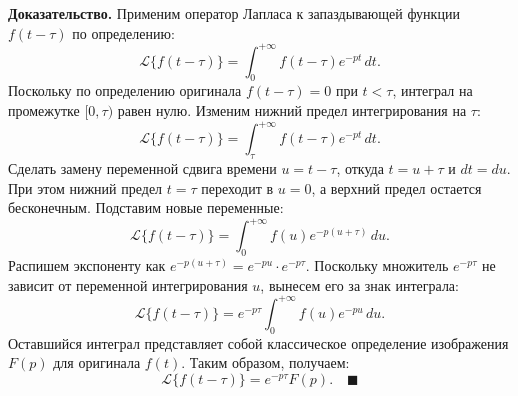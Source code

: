 \documentclass[12pt, a4paper]{article}
\theoremstyle{definition}
\theoremstyle{remark}
\begin{document}
\textbf{Доказательство.} Применим оператор Лапласа к запаздывающей функции $f(t - \tau)$ по определению:
$$\mathcal{L}\{f(t - \tau)\} = \int_{0}^{+\infty} f(t - \tau) e^{-pt} \, dt.$$
Поскольку по определению оригинала $f(t - \tau) = 0$ при $t < \tau$, интеграл на промежутке $[0, \tau)$ равен нулю. Изменим нижний предел интегрирования на $\tau$:
$$\mathcal{L}\{f(t - \tau)\} = \int_{\tau}^{+\infty} f(t - \tau) e^{-pt} \, dt.$$
Сделать замену переменной сдвига времени $u = t - \tau$, откуда $t = u + \tau$ и $dt = du$. При этом нижний предел $t = \tau$ переходит в $u = 0$, а верхний предел остается бесконечным. Подставим новые переменные:
$$\mathcal{L}\{f(t - \tau)\} = \int_{0}^{+\infty} f(u) e^{-p(u + \tau)} \, du.$$
Распишем экспоненту как $e^{-p(u + \tau)} = e^{-pu} \cdot e^{-p\tau}$. Поскольку множитель $e^{-p\tau}$ не зависит от переменной интегрирования $u$, вынесем его за знак интеграла:
$$\mathcal{L}\{f(t - \tau)\} = e^{-p\tau} \int_{0}^{+\infty} f(u) e^{-pu} \, du.$$
Оставшийся интеграл представляет собой классическое определение изображения $F(p)$ для оригинала $f(t)$. Таким образом, получаем:
$$\mathcal{L}\{f(t - \tau)\} = e^{-p\tau} F(p). \quad \blacksquare$$
\end{document}
